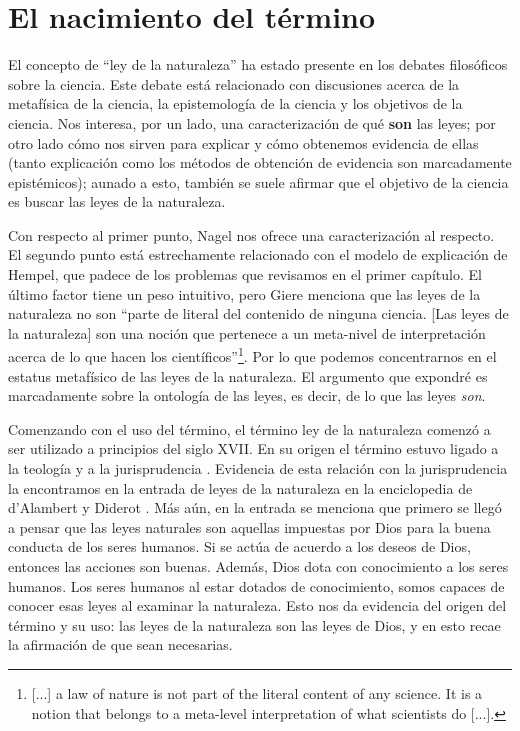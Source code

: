 \section{El nacimiento del término}

\noindent El concepto de ``ley de la naturaleza'' ha estado presente en los debates filosóficos sobre la ciencia. Este debate está relacionado con discusiones acerca de la metafísica de la ciencia, la epistemología de la ciencia y los objetivos de la ciencia. Nos interesa, por un lado, una caracterización de qué \textbf{son} las leyes; por otro lado cómo nos sirven para explicar y cómo obtenemos evidencia de ellas (tanto explicación como los métodos de obtención de evidencia son marcadamente epistémicos); aunado a esto, también se suele afirmar que el objetivo de la ciencia es buscar las leyes de la naturaleza.

Con respecto al primer punto, Nagel nos ofrece una caracterización al respecto. El segundo punto está estrechamente relacionado con el modelo de explicación de Hempel, que padece de los problemas que revisamos en el primer capítulo. El último factor tiene un peso intuitivo, pero Giere \citeyear[p. 69]{Giere2006} menciona que las leyes de la naturaleza no son ``parte de literal del contenido de ninguna ciencia. [Las leyes de la naturaleza] son una noción que pertenece a un meta-nivel de interpretación acerca de lo que hacen los científicos''\footnote{[...] a law of nature is not part of the literal content of any science. It is a notion that belongs to a meta-level interpretation of what scientists do [...].}. Por lo que podemos concentrarnos en el estatus metafísico de las leyes de la naturaleza. El argumento que expondré es marcadamente sobre la ontología de las leyes, es decir, de lo que las leyes \textit{son}.

Comenzando con el uso del término, el término ley de la naturaleza comenzó a ser utilizado a principios del siglo XVII. En su origen el término estuvo ligado a la teología y a la jurisprudencia \cite{Giere2006, Giere1999}. Evidencia de esta relación con la jurisprudencia la encontramos en la entrada de leyes de la naturaleza en la enciclopedia de d'Alambert y Diderot \cite{lawna}. Más aún, en la entrada se menciona que primero se llegó a pensar que las leyes naturales son aquellas impuestas por Dios para la buena conducta de los seres humanos. Si se actúa de acuerdo a los deseos de Dios, entonces las acciones son buenas. Además, Dios dota con conocimiento a los seres humanos. Los seres humanos al estar dotados de conocimiento, somos capaces de conocer esas leyes al examinar la naturaleza. Esto nos da evidencia del origen del término y su uso: las leyes de  la naturaleza son las leyes de Dios, y en esto recae la afirmación de que sean necesarias.

